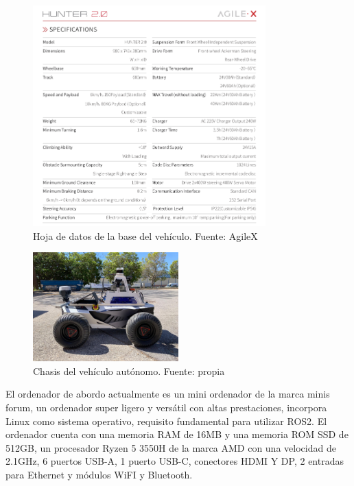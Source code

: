 \begin{figure}[H]
    \centering
    \includegraphics[width=0.8\textwidth]{images/hunter_datasheet.png}
    \caption{Hoja de datos de la base del vehículo. Fuente: AgileX}
    \label{fig:datasheet_hunter}
\end{figure}

\begin{figure}[h]
    \centering
    \includegraphics[width=0.5\textwidth]{images/hunter_v2.jpeg}
    \caption{Chasis del vehículo autónomo. Fuente: propia}
    \label{fig:hunter}
\end{figure}

El ordenador de abordo actualmente es un mini ordenador de la marca minis forum, un ordenador super ligero y versátil con altas 
prestaciones, incorpora Linux como sistema operativo, requisito fundamental para utilizar ROS2. El ordenador cuenta con una 
memoria RAM de 16MB y una memoria ROM SSD de 512GB, un procesador Ryzen 5 3550H de la marca AMD con una velocidad de 2.1GHz, 6 puertos USB-A, 
1 puerto USB-C, conectores HDMI Y DP, 2 entradas para Ethernet y módulos WiFI y Bluetooth.

